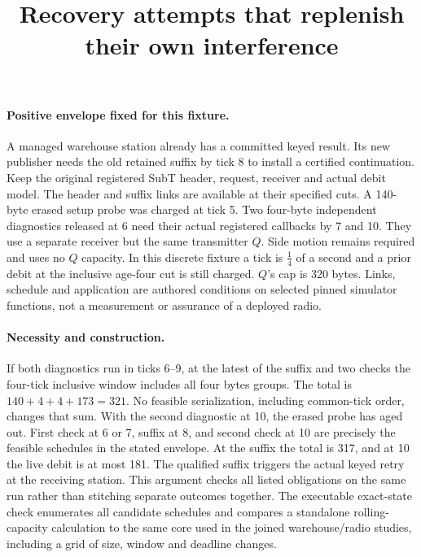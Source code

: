 \documentclass{article}
\title{Recovery attempts that replenish their own interference}
\begin{document}
\maketitle
\paragraph{Positive envelope fixed for this fixture.}
A managed warehouse station already has a committed keyed result. Its new publisher needs the old retained suffix by tick 8 to install a certified continuation. Keep the original registered SubT header, request, receiver and actual debit model. The header and suffix links are available at their specified cuts. A 140-byte erased setup probe was charged at tick 5. Two four-byte independent diagnostics released at 6 need their actual registered callbacks by 7 and 10. They use a separate receiver but the same transmitter \(Q\). Side motion remains required and uses no \(Q\) capacity. In this discrete fixture a tick is \(\tfrac14\) of a second and a prior debit at the inclusive age-four cut is still charged. \(Q\)'s cap is 320 bytes. Links, schedule and application are authored conditions on selected pinned simulator functions, not a measurement or assurance of a deployed radio.

\paragraph{Necessity and construction.}
If both diagnostics run in ticks 6--9, at the latest of the suffix and two checks the four-tick inclusive window includes all four bytes groups. The total is \(140+4+4+173=321\). No feasible serialization, including common-tick order, changes that sum. With the second diagnostic at 10, the erased probe has aged out. First check at 6 or 7, suffix at 8, and second check at 10 are precisely the feasible schedules in the stated envelope. At the suffix the total is 317, and at 10 the live debit is at most 181. The qualified suffix triggers the actual keyed retry at the receiving station. This argument checks all listed obligations on the same run rather than stitching separate outcomes together. The executable exact-state check enumerates all candidate schedules and compares a standalone rolling-capacity calculation to the same core used in the joined warehouse/radio studies, including a grid of size, window and deadline changes.
\end{document}

